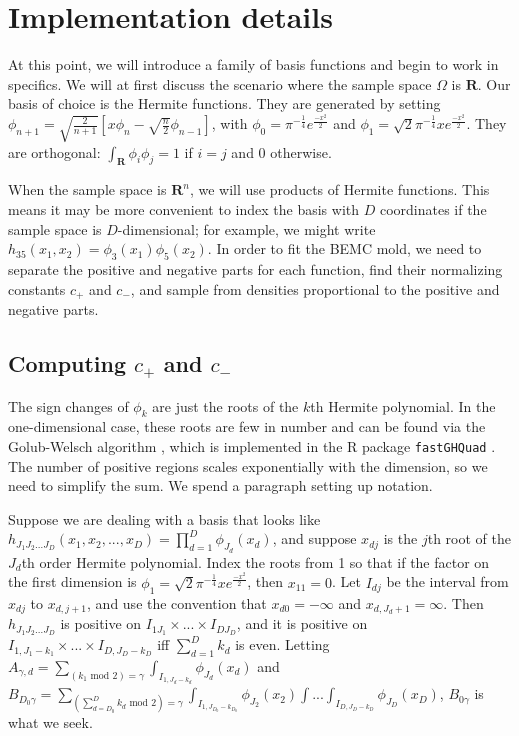 \documentclass{article}
\begin{document}
\section{Implementation details}
At this point, we will introduce a family of basis functions and begin to work in specifics. We will at first discuss the scenario where the sample space $\Omega$ is $\mathbf{R}$. %
Our basis of choice is the Hermite functions. They are generated by setting $\phi_{n+1}=\sqrt{\frac{2}{n+1}}\left[x\phi_n-\sqrt{\frac{n}{2}}\phi_{n-1}\right]$, with $\phi_0=\pi^{-\frac{1}{4}}e^{\frac{-x^2}{2}}$ and $\phi_1=\sqrt{2} \pi^{-\frac{1}{4}}xe^{\frac{-x^2}{2}}$. They are orthogonal: $\int_{\mathbf{R}}\phi_i\phi_j=1$ if $i = j$ and $0$ otherwise. 

When the sample space is $\mathbf{R}^n$, we will use products of Hermite functions. This means it may be more convenient to index the basis with $D$ coordinates if the sample space is $D$-dimensional;  for example, we might write $h_{35}(x_1, x_2)=\phi_3(x_1)\phi_5(x_2)$. 
In order to fit the BEMC mold, we need to separate the positive and negative parts for each function, find their normalizing constants $c_+$ and $c_-$, and sample from densities proportional to the positive and negative parts. 

\subsection{Computing $c_+$ and $c_-$}
The sign changes of $\phi_k$ are just the roots of the $k$th Hermite polynomial. In the one-dimensional case, these roots are few in number and can be found via the Golub-Welsch algorithm \cite{Golub:1969:CGQ}, which is implemented in the R package \texttt{fastGHQuad} \cite{Blocker:2014rz}. The number of positive regions scales exponentially with the dimension, so we need to simplify the sum. We spend a paragraph setting up notation.

 Suppose we are dealing with a basis that looks like $h_{J_1 J_2 ... J_D}(x_1, x_2, ... , x_D)=\prod_{d=1}^D \phi_{J_d}(x_d)$, and suppose $x_{dj}$ is the $j$th root of the $J_d$th order Hermite polynomial. Index the roots from 1 so that if the factor on the first dimension is $\phi_1=\sqrt{2} \pi^{-\frac{1}{4}}xe^{\frac{-x^2}{2}}$, then $x_{11}=0$. Let $I_{dj}$ be the interval from $x_{dj}$ to $x_{d,j+1}$, and use the convention that $x_{d0}=-\infty$ and $x_{d,J_d+1}=\infty$. Then $h_{J_1 J_2 ... J_D}$ is positive on $I_{1J_1}\times ... \times I_{DJ_D}$, and it is positive on $I_{1,J_1-k_1}\times ... \times I_{D,J_D-k_D}$ iff $\sum_{d=1}^D k_d$ is even. Letting $A_{\gamma, d} = \sum_{\left(k_1 \text{ mod } 2\right) = \gamma} \int_{I_{1,J_d-k_d}}\phi_{J_d}(x_d)$ and $B_{{D_0}\gamma}=\sum_{\left(\sum_{d={D_0}}^D k_d \text{ mod } 2\right) = \gamma} \int_{I_{1,J_{D_0}-k_{D_0}}}\phi_{J_2}(x_2)\int ... \int_{I_{D,J_D-k_D}}  \phi_{J_D}(x_D)$, $B_{0\gamma}$ is what we seek.
\end{document}
